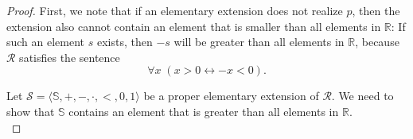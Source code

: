 \documentclass{article}
\begin{document}
\begin{enumerate}[label={\bf Q\arabic*:}]
    \begin{proof}
      First, we note that if an elementary extension does not realize $p$,
      then the extension also cannot contain an element that is smaller
      than all elements in $\mathbb{R}$: If such an element $s$ exists,
      then $-s$ will be greater than all elements in $\mathbb{R}$, because
      $\mathcal{R}$ satisfies the sentence
      \begin{equation*}
        \forall x\; (x>0\leftrightarrow -x<0).
      \end{equation*}

      Let $\mathcal{S}=\langle\mathbb{S},+,-,\cdot,<,0,1\rangle$ be a
      proper elementary extension of $\mathcal{R}$. We need to show that
      $\mathbb{S}$ contains an element that is greater than all elements in
      $\mathbb{R}$. \\





\end{proof}
\end{enumerate}
\end{document}
